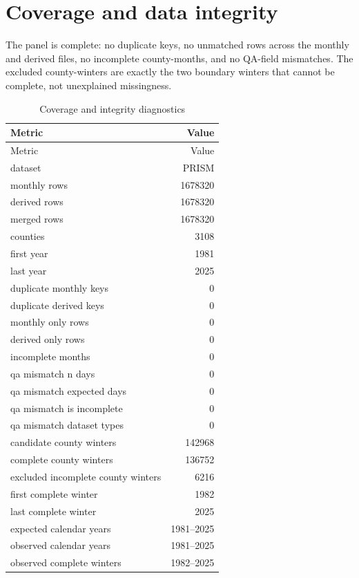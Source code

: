 \documentclass[11pt, english, letterpaper]{article}
\begin{document}
\section{Coverage and data integrity}
The panel is complete: no duplicate keys, no unmatched rows across the monthly
and derived files, no incomplete county-months, and no QA-field mismatches. The
excluded county-winters are exactly the two boundary winters that cannot be
complete, not unexplained missingness.
\par
\begin{longtable}{@{}lr@{}}
\caption{Coverage and integrity diagnostics}\\
\toprule Metric & Value \\ \midrule \endfirsthead
\toprule Metric & Value \\ \midrule \endhead
\bottomrule \endfoot
dataset & PRISM \\
monthly rows & 1678320 \\
derived rows & 1678320 \\
merged rows & 1678320 \\
counties & 3108 \\
first year & 1981 \\
last year & 2025 \\
duplicate monthly keys & 0 \\
duplicate derived keys & 0 \\
monthly only rows & 0 \\
derived only rows & 0 \\
incomplete months & 0 \\
qa mismatch n days & 0 \\
qa mismatch expected days & 0 \\
qa mismatch is incomplete & 0 \\
qa mismatch dataset types & 0 \\
candidate county winters & 142968 \\
complete county winters & 136752 \\
excluded incomplete county winters & 6216 \\
first complete winter & 1982 \\
last complete winter & 2025 \\
expected calendar years & 1981–2025 \\
observed calendar years & 1981–2025 \\
observed complete winters & 1982–2025 \\
\end{longtable}
\end{document}
